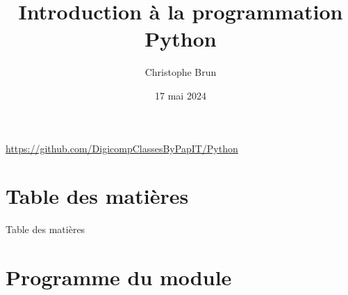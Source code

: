 \documentclass{beamer}
\title[PYTHON]{Introduction à la programmation Python}
\author{Christophe Brun}
\institute{Digicomp}
\date{17 mai 2024}
\begin{document}
    \begin{frame}
        \titlepage
        \bigbreak
        \centering
        \url{https://github.com/DigicompClassesByPapIT/Python}
    \end{frame}


    \section{Table des matières}\label{sec:toc}

    \begin{frame}{Table des matières}
        \begin{small}
            \begin{multicols}{2}
                \tableofcontents
            \end{multicols}
        \end{small}
    \end{frame}


    \section{Programme du module}\label{sec:programme-du-module}
\end{document}
